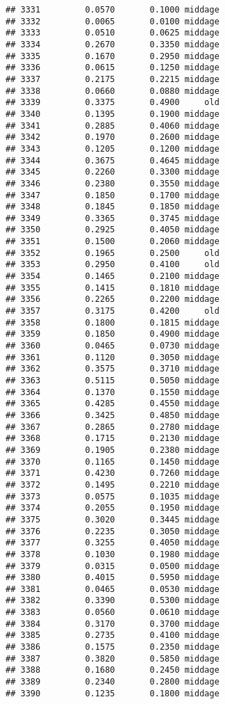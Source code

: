 \documentclass[
]{article}
\begin{document}
\begin{verbatim}
## 3331         0.0570       0.1000 middage
## 3332         0.0065       0.0100 middage
## 3333         0.0510       0.0625 middage
## 3334         0.2670       0.3350 middage
## 3335         0.1670       0.2950 middage
## 3336         0.0615       0.1250 middage
## 3337         0.2175       0.2215 middage
## 3338         0.0660       0.0880 middage
## 3339         0.3375       0.4900     old
## 3340         0.1395       0.1900 middage
## 3341         0.2885       0.4060 middage
## 3342         0.1970       0.2600 middage
## 3343         0.1205       0.1200 middage
## 3344         0.3675       0.4645 middage
## 3345         0.2260       0.3300 middage
## 3346         0.2380       0.3550 middage
## 3347         0.1850       0.1700 middage
## 3348         0.1845       0.1850 middage
## 3349         0.3365       0.3745 middage
## 3350         0.2925       0.4050 middage
## 3351         0.1500       0.2060 middage
## 3352         0.1965       0.2500     old
## 3353         0.2950       0.4100     old
## 3354         0.1465       0.2100 middage
## 3355         0.1415       0.1810 middage
## 3356         0.2265       0.2200 middage
## 3357         0.3175       0.4200     old
## 3358         0.1800       0.1815 middage
## 3359         0.1850       0.4900 middage
## 3360         0.0465       0.0730 middage
## 3361         0.1120       0.3050 middage
## 3362         0.3575       0.3710 middage
## 3363         0.5115       0.5050 middage
## 3364         0.1370       0.1550 middage
## 3365         0.4285       0.4550 middage
## 3366         0.3425       0.4850 middage
## 3367         0.2865       0.2780 middage
## 3368         0.1715       0.2130 middage
## 3369         0.1905       0.2380 middage
## 3370         0.1165       0.1450 middage
## 3371         0.4230       0.7260 middage
## 3372         0.1495       0.2210 middage
## 3373         0.0575       0.1035 middage
## 3374         0.2055       0.1950 middage
## 3375         0.3020       0.3445 middage
## 3376         0.2235       0.3050 middage
## 3377         0.3255       0.4050 middage
## 3378         0.1030       0.1980 middage
## 3379         0.0315       0.0500 middage
## 3380         0.4015       0.5950 middage
## 3381         0.0465       0.0530 middage
## 3382         0.3390       0.5300 middage
## 3383         0.0560       0.0610 middage
## 3384         0.3170       0.3700 middage
## 3385         0.2735       0.4100 middage
## 3386         0.1575       0.2350 middage
## 3387         0.3820       0.5850 middage
## 3388         0.1680       0.2450 middage
## 3389         0.2340       0.2800 middage
## 3390         0.1235       0.1800 middage

\end{verbatim}
\end{document}
